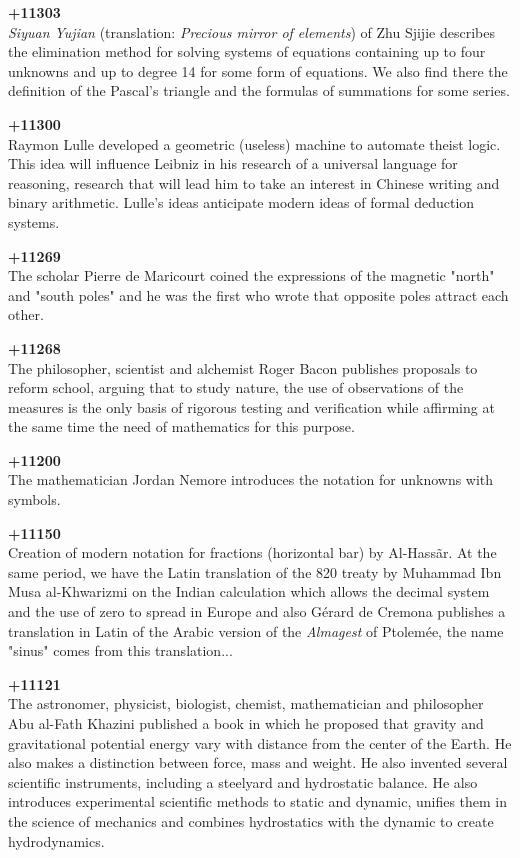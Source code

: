 \textbf{+11303}\\
\textit{Siyuan Yujian }(translation:\textit{ Precious mirror of elements}) of Zhu Sjijie describes the elimination method for solving systems of equations containing up to four unknowns and up to degree 14 for some form of equations. We also find there the definition of the Pascal's triangle and the formulas of summations for some series.

\textbf{+11300}\\
Raymon Lulle developed a geometric (useless) machine to automate theist logic. This idea will influence Leibniz in his research of a universal language for reasoning, research that will lead him to take an interest in Chinese writing and binary arithmetic. Lulle's ideas anticipate modern ideas of formal deduction systems.

\textbf{+11269}\\
The scholar Pierre de Maricourt coined the expressions of the magnetic "north" and "south poles" and he was the first who wrote that opposite poles attract each other.

\textbf{+11268}\\
The philosopher, scientist and alchemist Roger Bacon publishes proposals to reform school, arguing that to study nature, the use of observations of the measures is the only basis of rigorous testing and verification while affirming at the same time the need of mathematics for this purpose.

\textbf{+11200}\\
The mathematician Jordan Nemore introduces the notation for unknowns with symbols.

\textbf{+11150}\\
Creation of modern notation for fractions (horizontal bar) by Al-Hassãr. At the same period, we have the Latin translation of the 820 treaty by Muhammad Ibn Musa al-Khwarizmi on the Indian calculation which allows the decimal system and the use of zero to spread in Europe and also Gérard de Cremona publishes a translation in Latin of the Arabic version of the \textit{Almagest} of Ptolemée, the name "sinus" comes from this translation...

\textbf{+11121}\\
The astronomer, physicist, biologist, chemist, mathematician and philosopher Abu al-Fath Khazini published a book in which he proposed that gravity and gravitational potential energy vary with distance from the center of the Earth. He also makes a distinction between force, mass and weight. He also invented several scientific instruments, including a steelyard and hydrostatic balance. He also introduces experimental scientific methods to static and dynamic, unifies them in the science of mechanics and combines hydrostatics with the dynamic to create hydrodynamics.

